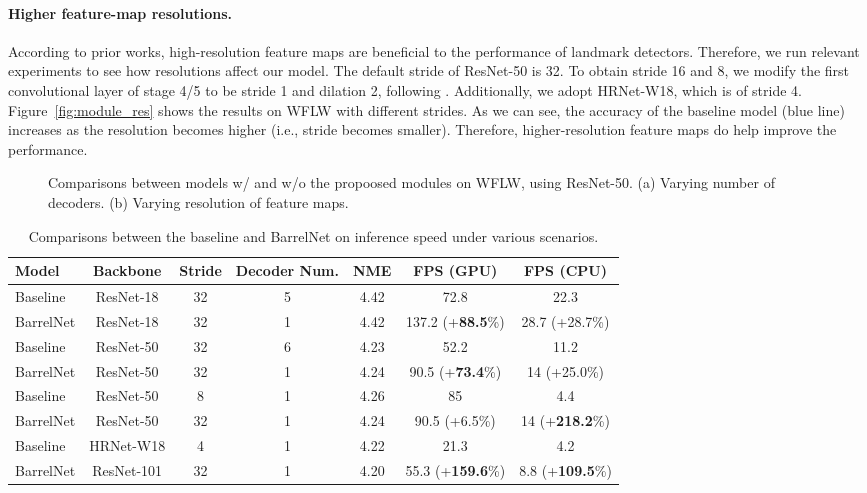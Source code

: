 \documentclass{article}
\begin{document}
\paragraph{Higher feature-map resolutions.}
According to prior works, high-resolution feature maps are beneficial to the performance of landmark detectors. Therefore, we run relevant experiments to see how resolutions affect our model. The default stride of ResNet-50 is 32. To obtain stride 16 and 8, we modify the first convolutional layer of stage 4/5 to be stride 1 and dilation 2, following \citep{CMS20}. Additionally, we adopt HRNet-W18, which is of stride 4. Figure~\ref{fig:module_res} shows the results on WFLW with different strides. As we can see, the accuracy of the baseline model (blue line) increases as the resolution becomes higher (i.e., stride becomes smaller). Therefore, higher-resolution feature maps do help improve the performance.

\begin{figure}
\centering
    \vspace{-3mm}
    \caption{Comparisons between models w/ and w/o the propoosed modules on WFLW, using ResNet-50. (a) Varying number of decoders. (b) Varying resolution of feature maps. \label{fig:module}}
\end{figure}

\begin{table}
  \caption{Comparisons between the baseline and BarrelNet on inference speed under various scenarios.}
  \label{tab:module_speed}
  \centering
  \begin{tabular}{lcccccc}
    \toprule
    Model   &Backbone     & Stride  & Decoder Num.     & NME  & FPS (GPU)  & FPS (CPU) \\
    \midrule
    Baseline  & ResNet-18 & 32  & 5  & 4.42  & 72.8  & 22.3     \\
    BarrelNet  & ResNet-18 & 32  & 1  & 4.42  & 137.2 (+\textbf{88.5}\%)  & 28.7 (+28.7\%)    \\
    \midrule
    Baseline  & ResNet-50 & 32  & 6  & 4.23  & 52.2  & 11.2     \\
    BarrelNet  & ResNet-50 & 32  & 1  & 4.24  & 90.5 (+\textbf{73.4}\%) & 14 (+25.0\%)     \\
    \midrule
    Baseline  & ResNet-50 & 8  & 1  & 4.26  & 85  & 4.4     \\
    BarrelNet  & ResNet-50 & 32  & 1  & 4.24  & 90.5 (+6.5\%)  & 14 (+\textbf{218.2}\%)    \\
    \midrule
    Baseline  & HRNet-W18 & 4  & 1  & 4.22  & 21.3  & 4.2     \\
    BarrelNet  & ResNet-101 & 32  & 1  & 4.20  & 55.3 (+\textbf{159.6}\%)  & 8.8 (+\textbf{109.5}\%)    \\
    \bottomrule
  \end{tabular}
\end{table}
\end{document}
